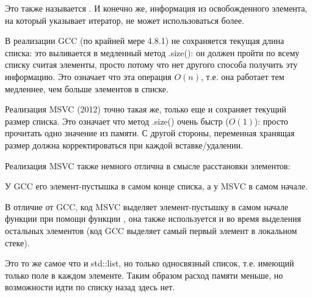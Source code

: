 Это также называется .
И конечно же, информация из освобожденного элемента, на который указывает итератор, 
не может использоваться более.

В реализации GCC (по крайней мере 4.8.1) не сохраняется текущая длина списка: это выливается в медленный
метод .size(): он должен пройти по всему списку считая элементы, просто потому что нет
другого способа получить эту информацию.
Это означает что эта операция $O(n)$, т.е. она работает тем медленнее, чем больше элементов в списке.





\label{MSVC_std_list}

Реализация MSVC (2012) точно такая же, только еще и сохраняет текущий размер списка.
Это означает что метод .size() очень быстр ($O(1)$): просто прочитать одно значение из памяти.
С другой стороны, переменная хранящая размер должна корректироваться при каждой вставке/удалении.

Реализация MSVC также немного отлична в смысле расстановки элементов:



У GCC его элемент-пустышка в самом конце списка, а у MSVC в самом начале.



В отличие от GCC, код MSVC выделяет элемент-пустышку в самом начале функции при помощи
функции , она также используется и во время выделения остальных элементов
(код GCC выделяет самый первый элемент в локальном стеке).




Это то же самое что и std::list, но только односвязный список, т.е. имеющий только поле  в каждом
элементе.
Таким образом расход памяти меньше, но возможности идти по списку назад здесь нет.

